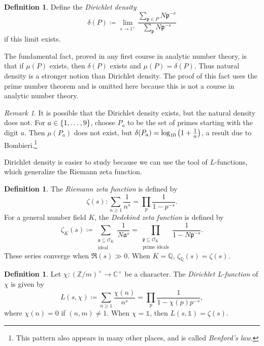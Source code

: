 \documentclass[leqno, openany]{memoir}
\theoremstyle{definition}
\newtheorem{defn}[thm]{Definition}
\theoremstyle{remark}
\newtheorem{rmk}[thm]{Remark}
\theoremstyle{plain}
\theoremstyle{definition}
\theoremstyle{remark}
\newcommand{\C}{\mathbb{C}}
\newcommand{\Z}{\mathbb{Z}}
\newcommand{\Q}{\mathbb{Q}}
\newcommand{\mc}[1]{\mathcal{#1}}
\newcommand{\mf}[1]{\mathfrak{#1}}
\begin{document}
\begin{defn}
    Define the \textit{Dirichlet density} 
    \[ \delta(P) \coloneqq \lim_{s \to 1^+} \frac{\sum_{\mf{p} \in P}N\mf{p}^{-s}}{\sum_{\mf{p}} N\mf{p}^{-s}} \]
    if this limit exists.
\end{defn}

The fundamental fact, proved in any first course in analytic number theory, is that if $\mu(P)$ exists, then $\delta(P)$ exists and $\mu(P) = \delta(P)$. Thus natural density is a stronger notion than Dirichlet density. The proof of this fact uses the prime number theorem and is omitted here because this is not a course in analytic number theory.

\begin{rmk}
    It is possible that the Dirichlet density exists, but the natural density does not. For $a \in \qty{1, \ldots, 9}$, choose $P_a$ to be the set of primes starting with the digit $a$. Then $\mu(P_a)$ does not exist, but $\delta(P_a) = \log_{10}\qty(1 + \frac{1}{a})$, a result due to Bombieri.\footnote{This pattern also appears in many other places, and is called \textit{Benford's law}.}
\end{rmk}

Dirichlet density is easier to study because we can use the tool of $L$-functions, which generalize the Riemann zeta function.

\begin{defn}
    The \textit{Riemann zeta function} is defined by
    \[ \zeta(s) \colon \sum_{n \geq 1} \frac{1}{n^s} = \prod_p \frac{1}{1-p^{-s}}. \]
    For a general number field $K$, the \textit{Dedekind zeta function} is defined by
    \[ \zeta_K(s) \coloneqq \sum_{\substack{\mf{a} \subseteq \mc{O}_K \\ \text{ideal}}} \frac{1}{N\mf{a}^s} = \prod_{\substack{\mf{p} \subseteq \mc{O}_K \\ \text{prime ideals}}} \frac{1}{1-N\mf{p}^{-s}}. \]
    These series converge when $\Re (s) \gg 0$. When $K = \Q$, $\zeta_{\Q}(s) = \zeta(s)$.
\end{defn}

\begin{defn}
    Let $\chi \colon {(\Z/m)}^{\times} \to \C^{\times}$ be a character. The \textit{Dirichlet L-function} of $\chi$ is given by
    \[ L(s, \chi) \coloneqq \sum_{n \geq 1} \frac{\chi(n)}{n^s} = \prod_p \frac{1}{1- \chi(p) p^{-s}}, \]
    where $\chi(n) = 0$ if $(n,m) \neq 1$. When $\chi = \mathbb{1}$, then $L(s, \mathbb{1}) = \zeta(s)$.
\end{defn}
\end{document}
